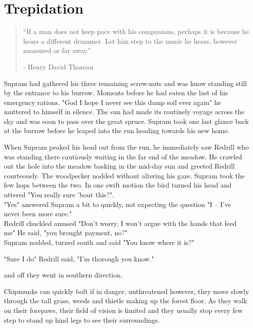 \documentclass[smalldemyvopaper,11pt,twoside,onecolumn,openright,extrafontsizes]{memoir}
\begin{document}
\chapter{Trepidation}

\vspace{-1.3cm}
\begin{localsize}{10}
	\begin{quote}
		“If a man does not keep pace with his companions, perhaps it is because he hears a different drummer. Let him step to the music he hears, however measured or far away.”
		\begin{flushright}- Henry David Thoreau \end{flushright}
	\end{quote} 
\end{localsize}
\vspace{1cm}


Supram had gathered his three remaining screw-nuts and was know standing still by the entrance to his burrow. Moments before he had eaten the last of his 
emergency rations. "God I hope I never see this damp soil ever again" he muttered to himself in silence. The sun had made its routinely voyage across the sky and was soon to pass over the great spruce. Supram took one last glance back at the burrow before he leaped into the run heading towards his new home. 

When Supram peaked his head out from the run, he immediately saw Redrill who was standing there cautiously waiting in the far end of the meadow. He crawled out the hole into the meadow basking in the mid-day sun and greeted Redrill courteously. The woodpecker nodded without altering his gaze. Supram took the few hops between the two. In one swift motion the bird turned his head and uttered "You really sure 'bout this?".\\

"Yes" answered Supram a bit to quickly, not expecting the question "I -- I've never been more sure."\\

Redrill chuckled amused "Don't worry, I won't argue with the hands that feed me" He said, "you brought payment, no?"\\

Supram nodded, turned south and said "You know where it is?"

"Sure I do" Redrill said, "I'm thorough you know."

and off they went in southern direction.

Chipmunks can quickly bolt if in danger, unthreatened however, they move slowly through the tall grass, weeds and thistle making up the forest floor. As they walk on their forepaws, their field of vision is limited and they usually stop every few step to stand up hind legs to see their surroundings.
\end{document}
